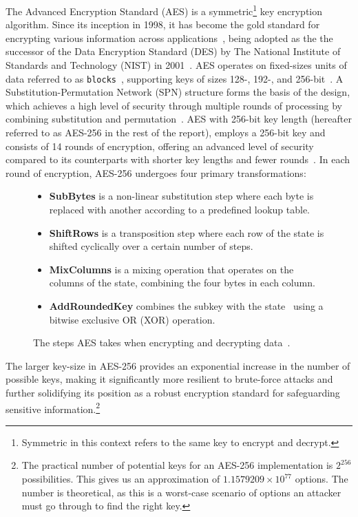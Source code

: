 The Advanced Encryption Standard (AES) is a symmetric\footnote{
  Symmetric in this context refers to the same key to encrypt and
  decrypt.
} key encryption algorithm.
Since its inception in 1998, it has become the gold standard for encrypting various
information across applications~\cite{schneier2015applied,rijndael_book}, being adopted as the
the successor of the Data Encryption Standard (DES) by The National Institute of
Standards and Technology (NIST) in 2001~\cite{nist_aes_winner}.
AES operates on fixed-sizes units of data referred to as \texttt{blocks}~\cite{nistfips197blocks},
supporting keys of sizes 128-, 192-, and 256-bit~\cite{nistfips197intro}.
A Substitution-Permutation Network (SPN) structure forms the basis of the design,
which achieves a high level of security through multiple rounds of processing by
combining substitution and permutation~\cite{nistfips197specification}.
AES with 256-bit key length (hereafter referred to as AES-256 in the rest
of the report), employs a 256-bit key and consists of 14 rounds of encryption,
offering an advanced level of security compared to its counterparts with shorter
key lengths and fewer rounds~\cite{nistfips197256}.
In each round of encryption, AES-256 undergoes four primary transformations:
\begin{figure}[htbp]
  \begin{itemize}
    \item \textbf{SubBytes} is a non-linear substitution step where each byte is replaced with
    another according to a predefined lookup table.
    \item \textbf{ShiftRows} is a transposition step where each row of the state
    is shifted cyclically over a certain number of steps.
    \item \textbf{MixColumns} is a mixing operation that operates on the columns of the state,
    combining the four bytes in each column.
    \item \textbf{AddRoundedKey} combines the subkey with the state\protect\footnotemark
    ~using a bitwise exclusive OR (XOR) operation.
  \end{itemize}
  \caption{The steps AES takes when encrypting and decrypting data~\cite{nistfips197specification}.}
  \label{fig:aessteps}
\end{figure}
\newline
The larger key-size in AES-256 provides an exponential increase in the number of
possible keys, making it significantly more resilient to brute-force attacks
and further solidifying its position as a robust encryption standard for
safeguarding sensitive information.\footnote{
  The practical number of potential keys for an AES-256 implementation is
  $2^{256}$ possibilities. This gives us an approximation of $1.1579209 \times 10^{77}$
  options.
  The number is theoretical, as this is a worst-case scenario of options an attacker must go through to find the right key.
}

